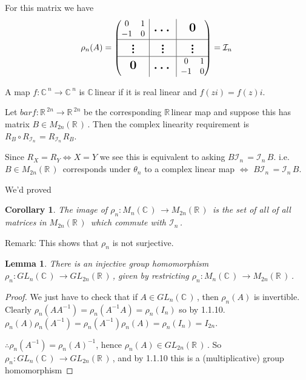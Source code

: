 \documentclass[12pt,a4paper]{article}
\newcommand{\rR}{\ensuremath{\mathbb{R}\,}}
\newcommand{\cC}{\ensuremath{\mathbb{C}\,}}
\newcommand{\mnc}{\ensuremath{M_n(\cC)\,}}
\newcommand{\mr}[1]{\ensuremath{M_{#1}(\rR)\,}}
\newcommand{\glnc}{\ensuremath{GL_n(\cC)\,}}
\newcommand{\glr}[1]{\ensuremath{GL_{#1}(\rR)\,}}
\newcommand{\cin}{\ensuremath{\mathcal{I}_n\,}}
\newtheorem{lemma}[thm]{Lemma}
\newtheorem{cor}[thm]{Corollary}
\newcommand{\rvline}{\hspace*{-\arraycolsep}\vline\hspace*{-\arraycolsep}}
\newcommand{\bigzero}{\mbox{\normalfont\Large\bfseries 0}}
\newcommand{\bigld}{\mbox{\normalfont\Large\bfseries \ldots}}
\newcommand{\bigvd}{\mbox{\normalfont\Large\bfseries \vdots}}
\begin{document}
For this matrix we have 
\[\rho_n(A)=\begin{pmatrix}
  \begin{matrix}
  0 & 1  \\
  -1 &   0
  \end{matrix}
  & \rvline & \bigld  & \rvline &
  \bigzero
  \\
\hline

  \bigvd
  & \rvline & \bigvd  & \rvline &
  \bigvd
  \\
\hline
    \bigzero
  & \rvline & \bigld  & \rvline &
  \begin{matrix}
  0 & 1  \\
  -1 &   0
  \end{matrix}  
\end{pmatrix}=\cin
\]

A map $f:\cC^n\to \cC^n$ is \cC linear if it is real linear and $f(zi)=f(z)i$.

Let $bar{f}:\rR^{2n}\to \rR^{2n}$ be the corresponding \rR linear map and suppose this has matrix $B\in \mr{2n}$. Then the complex linearity requirement is $R_B\circ R_{\cin}=R_{\cin}R_{B}$. 

Since $R_X=R_Y \iff X=Y$ we see this is equivalent to asking $B\cin=\cin B$. i.e. $B\in \mr{2n}$ corresponds under $\theta_n$ to a complex linear map $\iff$  $B\cin=\cin B$.

We'd proved

\begin{cor}
The image of $\rho_n:\mnc \to \mr{2n}$ is the set of all of all matrices in \mr{2n} which commute with \cin .
\end{cor}

Remark: This shows that $\rho_n$ is not surjective.

\begin{lemma}
There is an injective group homomorphism $\rho_n : \glnc \to \glr{2n}$, given by restricting $\rho_n : \mnc \to \mr{2n}$.
\end{lemma}

\begin{proof}
We just have to check that if $A\in \glnc$, then $\rho_n(A)$ is invertible. Clearly $\rho_n(AA^{-1})=\rho_n(A^{-1}A)=\rho_n(I_n)$ so by 1.1.10. $\rho_n(A)\rho_n(A^{-1})=\rho_n(A^{-1})\rho_n(A)=\rho_n(I_n)=I_{2n}$. 

$\therefore \rho_n(A^{-1})=\rho_n(A)^{-1}$, hence $\rho_n(A)\in\glr{2n}$. So $\rho_n:\glnc\to\glr{2n}$, and by 1.1.10 this is a (multiplicative) group homomorphism 
\end{proof}
\end{document}
